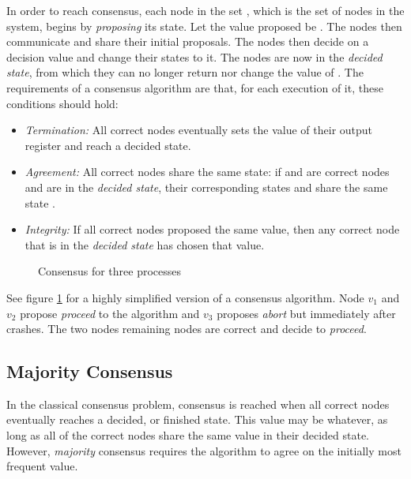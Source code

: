 In order to reach consensus, each node in the set , which is the set of nodes in the system, begins by \emph{proposing} its state. Let the value proposed be . The nodes then communicate and share their initial proposals. The nodes then decide on a decision value  and change their states to it. The nodes are now in the \emph{decided state}, from which they can no longer return nor change the value of . The requirements of a consensus algorithm are that, for each execution of it, these conditions should hold:

\begin{itemize}[label={}]
  \item \emph{Termination:} All correct nodes eventually sets the value of their output register and reach a decided state.
  \item \emph{Agreement:} All correct nodes share the same state: if  and  are correct nodes and are in the \emph{decided state}, their corresponding states  and  share the same state .
  \item \emph{Integrity:} If all correct nodes proposed the same value, then any correct node that is in the \emph{decided state} has chosen that value.
\end{itemize}


\begin{figure}[H]
    \centering
    
    \caption{Consensus for three processes}
    \label{fig:ConsensusProblem}
\end{figure}


See figure \ref{fig:ConsensusProblem} for a highly simplified version of a consensus algorithm. Node $v_1$ and $v_2$ propose \emph{proceed} to the algorithm and $v_3$ proposes \emph{abort} but immediately after crashes. The two nodes remaining nodes are correct and decide to \emph{proceed}.

\subsection{Majority Consensus}

In the classical consensus problem, consensus is reached when all correct nodes eventually reaches a decided, or finished state. This value may be whatever, as long as all of the correct nodes share the same value in their decided state. However, \emph{majority} consensus requires the algorithm to agree on the initially most frequent value.

